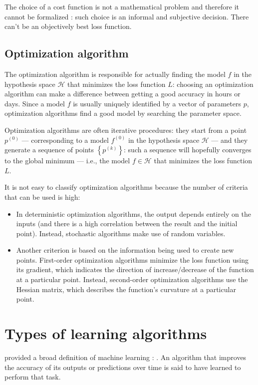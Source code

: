             The choice of a cost function is not a mathematical problem and therefore it cannot be formalized \cite{Hennig}: such choice is an informal and subjective decision. There can't be an objectively best loss function.
        \subsection{Optimization algorithm}
            The optimization algorithm is responsible for actually finding the model \(f\) in the hypothesis space \(\mathcal{H}\) that minimizes the loss function \(L\): choosing an optimization algorithm can make a difference between getting a good accuracy in hours or days. Since a model \(f\) is usually uniquely identified by a vector of parameters \(p\), optimization algorithms find a good model by searching the parameter space.
            
            Optimization algorithms are often iterative procedures: they start from a point \(p^{\left(0\right)}\) --- corresponding to a model \(f^{\left(0\right)}\) in the hypothesis space \(\mathcal{H}\) --- and they generate a sequence of points \(\left\{p^{\left(k\right)}\right\}\): such a sequence will hopefully converges to the global minimum --- i.e., the model \(f \in \mathcal{H}\) that minimizes the loss function \(L\).
            
            It is not easy to classify optimization algorithms because the number of criteria that can be used is high:
            \begin{itemize}
                \item In deterministic optimization algorithms, the output depends entirely on the inputs (and there is a high correlation between the result and the initial point). Instead, stochastic algorithms make use of random variables.
                \item Another criterion is based on the information being used to create new points. First-order optimization algorithms minimize the loss function using its gradient, which indicates the direction of increase/decrease of the function at a particular point. Instead, second-order optimization algorithms use the Hessian matrix, which describes the function's curvature at a particular point.
            \end{itemize}
    \section{Types of learning algorithms}
        \citeauthor{Mitchell} provided a broad definition of machine learning \cite[2]{Mitchell}: . An algorithm that improves the accuracy of its outputs or predictions over time is said to have learned to perform that task.
